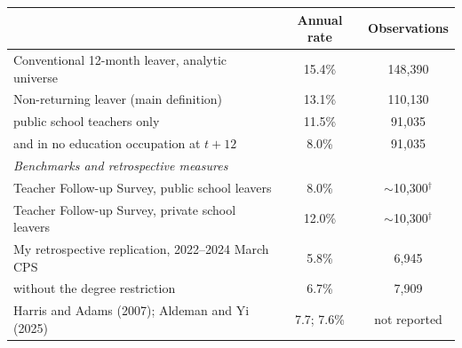 \begin{tabular}{lcc}
\toprule
 & Annual rate & Observations \\
\midrule
Conventional 12-month leaver, analytic universe & 15.4\% & 148,390 \\
Non-returning leaver (main definition) & 13.1\% & 110,130 \\
\quad public school teachers only & 11.5\% & 91,035 \\
\quad and in no education occupation at $t{+}12$ & 8.0\% & 91,035 \\
\midrule
\multicolumn{3}{l}{\textit{Benchmarks and retrospective measures}} \\[2pt]
Teacher Follow-up Survey, public school leavers & 8.0\% & $\sim$10,300$^{\dagger}$ \\
Teacher Follow-up Survey, private school leavers & 12.0\% & $\sim$10,300$^{\dagger}$ \\
My retrospective replication, 2022--2024 March CPS & 5.8\% & 6,945 \\
\quad without the degree restriction & 6.7\% & 7,909 \\
Harris and Adams (2007); Aldeman and Yi (2025) & 7.7; 7.6\% & not reported \\
\bottomrule
\end{tabular}

